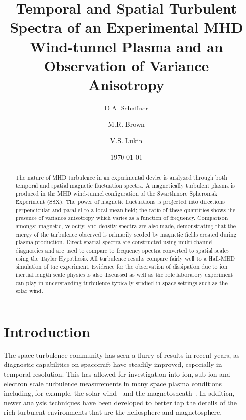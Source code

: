 \documentclass[aip,prl,amsmath,amssymb,reprint,superscriptaddress]{revtex4-1} %
\begin{document}
\title{Temporal and Spatial Turbulent Spectra of an Experimental MHD Wind-tunnel Plasma and an Observation of Variance Anisotropy}

\author{D.A. Schaffner}
\author{M.R. Brown}
\author{V.S. Lukin}

\date{\today}
\begin{abstract}
The nature of MHD turbulence in an experimental device is analyzed through both temporal and spatial magnetic fluctuation spectra. A magnetically turbulent plasma is produced in the MHD wind-tunnel configuration of the Swarthmore Spheromak Experiment (SSX). The power of magnetic fluctuations is projected into directions perpendicular and parallel to a local mean field; the ratio of these quantities shows the presence of variance anisotropy which varies as a function of frequency. Comparison amongst magnetic, velocity, and density spectra are also made, demonstrating that the energy of the turbulence observed is primarily seeded by magnetic fields created during plasma production. Direct spatial spectra are constructed using multi-channel diagnostics and are used to compare to frequency spectra converted to spatial scales using the Taylor Hypothesis. All turbulence results compare fairly well to a Hall-MHD simulation of the experiment. Evidence for the observation of dissipation due to ion inertial length scale physics is also discussed as well as the role laboratory experiment can play in understanding turbulence typically studied in space settings such as the solar wind.
\end{abstract}

\maketitle

\section{Introduction}

The space turbulence community has seen a flurry of results in recent years, as diagnostic capabilities on spacecraft have steadily improved, especially in temporal resolution. This has allowed for investigation into ion, sub-ion and electron scale turbulence measurements in many space plasma conditions including, for example, the solar wind~\cite{alexandrova09,sahraoui09} and the magnetosheath~\cite{sahraoui06,yordanova08}. In addition, newer analysis techniques have been developed to better tap the details of the rich turbulent environments that are the heliosphere and magnetosphere. 
\end{document}
